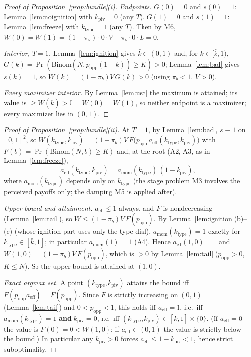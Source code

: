 \begin{proof}[Proof of Proposition~\ref{prop:bundle}(i)]
\emph{Endpoints.} $G(0)=0$ and $s(0)=1$: Lemma~\ref{lem:noignition} with $k_{\mathrm{piv}}=0$
(any $T$). $G(1)=0$ and $s(1)=1$: Lemma~\ref{lem:freeze} with $k_{\mathrm{type}}=1$ (any $T$).
Then by M6, $W(0)=W(1)=(1-\pi_b)\cdot 0\cdot V-\pi_b\cdot 0\cdot L=0$.

\emph{Interior, $T=1$.} Lemma~\ref{lem:ignition} gives $\bar k\in(0,1)$ and, for
$k\in[\bar k,1)$, $G(k)=\Pr(\mathrm{Binom}(N,p_{\mathrm{opp}}(1-k))\ge K)>0$;
Lemma~\ref{lem:bad} gives $s(k)=1$, so $W(k)=(1-\pi_b)V\,G(k)>0$ (using $\pi_b<1$, $V>0$).

\emph{Every maximizer interior.} By Lemma~\ref{lem:usc} the maximum is attained; its value is
$\ge W(\bar k)>0=W(0)=W(1)$, so neither endpoint is a maximizer; every maximizer lies in
$(0,1)$.
\end{proof}

\begin{proof}[Proof of Proposition~\ref{prop:bundle}(ii)]
At $T=1$, by Lemma~\ref{lem:bad}, $s\equiv 1$ on $[0,1]^2$, so
$W(k_{\mathrm{type}},k_{\mathrm{piv}})=(1-\pi_b)V\,F\big(p_{\mathrm{opp}}\,
a_{\mathrm{eff}}(k_{\mathrm{type}},k_{\mathrm{piv}})\big)$ with
$F(b)=\Pr(\mathrm{Binom}(N,b)\ge K)$ and, at the root (A2, A3, as in
Lemma~\ref{lem:freeze}),
\[
a_{\mathrm{eff}}(k_{\mathrm{type}},k_{\mathrm{piv}})
=a_{\mathrm{mom}}(k_{\mathrm{type}})\,(1-k_{\mathrm{piv}}),
\]
where $a_{\mathrm{mom}}(k_{\mathrm{type}})$ depends only on $k_{\mathrm{type}}$ (the stage
problem M3 involves the perceived payoffs only; the damping M5 is applied after).

\emph{Upper bound and attainment.} $a_{\mathrm{eff}}\le 1$ always, and $F$ is nondecreasing
(Lemma~\ref{lem:tail}), so $W\le(1-\pi_b)V\,F(p_{\mathrm{opp}})$. By
Lemma~\ref{lem:ignition}(b)--(c) (whose ignition part uses only the type dial),
$a_{\mathrm{mom}}(k_{\mathrm{type}})=1$ exactly for $k_{\mathrm{type}}\in[\bar k,1]$; in
particular $a_{\mathrm{mom}}(1)=1$ (A4). Hence $a_{\mathrm{eff}}(1,0)=1$ and
$W(1,0)=(1-\pi_b)V\,F(p_{\mathrm{opp}})$, which is $>0$ by Lemma~\ref{lem:tail}
($p_{\mathrm{opp}}>0$, $K\le N$). So the upper bound is attained at $(1,0)$.

\emph{Exact argmax set.} A point $(k_{\mathrm{type}},k_{\mathrm{piv}})$ attains the bound iff
$F(p_{\mathrm{opp}}a_{\mathrm{eff}})=F(p_{\mathrm{opp}})$. Since $F$ is strictly increasing on
$(0,1)$ (Lemma~\ref{lem:tail}) and $0<p_{\mathrm{opp}}<1$, this holds iff
$a_{\mathrm{eff}}=1$, i.e.\ iff $a_{\mathrm{mom}}(k_{\mathrm{type}})=1$ \textbf{and}
$k_{\mathrm{piv}}=0$, i.e.\ iff
$(k_{\mathrm{type}},k_{\mathrm{piv}})\in[\bar k,1]\times\{0\}$. (If $a_{\mathrm{eff}}=0$ the
value is $F(0)=0<W(1,0)$; if $a_{\mathrm{eff}}\in(0,1)$ the value is strictly below the
bound.) In particular any $k_{\mathrm{piv}}>0$ forces
$a_{\mathrm{eff}}\le 1-k_{\mathrm{piv}}<1$, hence strict suboptimality.
\end{proof}

